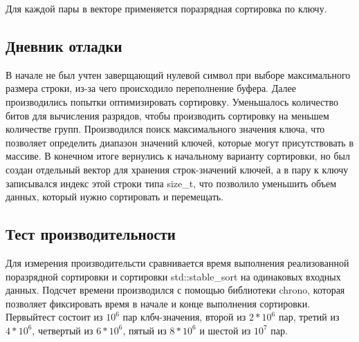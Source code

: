 \documentclass[12pt]{article}
\begin{document}
Для каждой пары в векторе применяется поразрядная сортировка по ключу.

\subsection*{Дневник отладки}

В начале не был учтен заверщающий нулевой символ при выборе максимального размера строки, из-за чего происходило переполнение буфера.\newline
Далее производились попытки оптимизировать сортировку. Уменьшалось количество битов для вычисления разрядов, чтобы производить сортировку на меньшем количестве групп. Производился поиск максимального значения ключа, что позволяет определить диапазон значений ключей, которые могут присутствовать в массиве.\newline
В конечном итоге вернулись к начальному варианту сортировки, но был создан отдельный вектор для хранения строк-значений ключей, а в пару к ключу записывался индекс этой строки типа size\_t, что позволило уменьшить объем данных, который нужно сортировать и перемещать.

\subsection*{Тест производительности}

Для измерения производительсти сравнивается время выполнения реализованной поразрядной сортировки и сортировки std::stable\_sort на одинаковых входных данных. Подсчет времени производился с помощью библиотеки chrono, которая позволяет фиксировать время в начале и конце выполнения сортировки. Первыйтест состоит из $10^6$ пар клбч-значения, второй из $2 * 10^6$ пар, третий из $4 *10^6$, четвертый из $6 * 10^6$, пятый из $8 * 10^6$ и шестой из $10^7$ пар.
\newline
\end{document}
